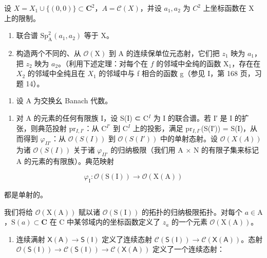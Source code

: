   设 \(X = X_{1} \cup \{(0,0)\} \subset \mathbf{C}^{2}\)，\(A = \mathcal{C}(X)\)，并设 \(a_{1}, a_{2}\) 为 \(C^{2}\) 上坐标函数在 X 上的限制。

\begin{enumerate}
\def\labelenumi{\alph{enumi})}
\item
  联合谱 \(\mathrm{Sp}_{\mathrm{A}}^{2}(a_{1},a_{2})\) 等于 X。
\item
  构造两个不同的、从 \(\mathcal{O}(\mathrm{X})\) 到 A 的连续保单位元态射，它们把 \(z_{1}\) 映为 \(a_{1}\)，把 \(z_{2}\) 映为 \(a_{2}\)。（利用下述定理：对每个在 \(f\) 的邻域中全纯的函数 \(\mathrm{X}_{1}\)，存在在 \(X_{2}\) 的邻域中全纯且在 \(X_{1}\) 的邻域中与 f 相合的函数 g（参见 I，第 168 页，习题 14）。
\end{enumerate}

\begin{enumerate}
\def\labelenumi{¶ \arabic{enumi})}
\setcounter{enumi}{17}
\tightlist
\item
  设 A 为交换幺 Banach 代数。
\end{enumerate}

\begin{enumerate}
\def\labelenumi{\alph{enumi})}
\tightlist
\item
  对 A 的元素的任何有限族 I，设 S(I) ⊂ C\(^{I}\) 为 I 的联合谱。若 I′ 是 I 的扩张，则典范投射 pr\(_{I,I'}\)：从 C\(^{I'}\) 到 C\(^{I}\) 上的投影，满足 pr\(_{I,I'}\)(S(I′)) = S(I)，从而得到 \(\varphi_{II'}\)：从 \(\mathcal{O}(S(I))\) 到 \(\mathcal{O}(S(I'))\) 中的单射态射。设 \(\mathcal{O}(X(A))\) 为诸 \(\mathcal{O}(S(I))\) 关于诸 \(\varphi_{II'}\) 的归纳极限（我们用 A × N 的有限子集来标记 A 的元素的有限族）。典范映射
\end{enumerate}

\[
\varphi_ {\mathrm{I}} \colon \mathcal {O} (\mathrm{S} (\mathrm{I})) \longrightarrow \mathcal {O} (\mathrm{X} (\mathrm{A}))
\]

都是单射的。

我们将给 \(\mathcal{O}(\mathrm{X(A)})\) 赋以诸 \(\mathcal{O}(\mathrm{S(I)})\) 的拓扑的归纳极限拓扑。对每个 \(a \in \mathrm{A}\)，\(\mathrm{S}(a) \subset \mathbf{C}\) 在 C 中某邻域内的坐标函数定义了 \(z_a\) 的一个元素 \(\mathcal{O}(\mathrm{X(A)})\)。

\begin{enumerate}
\def\labelenumi{\alph{enumi})}
\setcounter{enumi}{1}
\tightlist
\item
  连续满射 \(\mathsf{X}(\mathsf{A}) \to \mathsf{S}(\mathsf{I})\) 定义了连续态射 \(\mathcal{C}(\mathsf{S}(\mathsf{I})) \to \mathcal{C}(\mathsf{X}(\mathsf{A}))\)。态射 \(\mathcal{O}(\mathsf{S}(\mathsf{I})) \to \mathcal{C}(\mathsf{S}(\mathsf{I})) \to \mathcal{C}(\mathsf{X}(\mathsf{A}))\) 定义了一个连续态射：
\end{enumerate}

